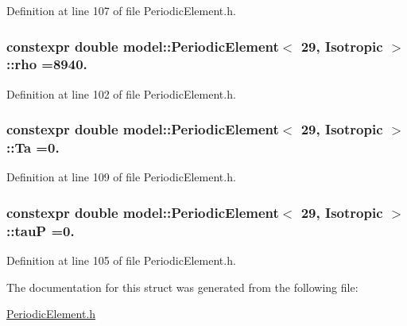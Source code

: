 Definition at line 107 of file Periodic\+Element.\+h.

\hypertarget{structmodel_1_1_periodic_element_3_0129_00_01_isotropic_01_4_a609e7ff6cc0c9f0669856defdfe05aa2}{}
\subsubsection[{rho}]{\setlength{\rightskip}{0pt plus 5cm}constexpr double {\bf model\+::\+Periodic\+Element}$<$ 29, {\bf Isotropic} $>$\+::rho =8940.\hspace{0.3cm}{\ttfamily [static]}}\label{structmodel_1_1_periodic_element_3_0129_00_01_isotropic_01_4_a609e7ff6cc0c9f0669856defdfe05aa2}


Definition at line 102 of file Periodic\+Element.\+h.

\hypertarget{structmodel_1_1_periodic_element_3_0129_00_01_isotropic_01_4_a33509e726cdb121a126343761e1cacbb}{}
\subsubsection[{Ta}]{\setlength{\rightskip}{0pt plus 5cm}constexpr double {\bf model\+::\+Periodic\+Element}$<$ 29, {\bf Isotropic} $>$\+::Ta =0.\hspace{0.3cm}{\ttfamily [static]}}\label{structmodel_1_1_periodic_element_3_0129_00_01_isotropic_01_4_a33509e726cdb121a126343761e1cacbb}


Definition at line 109 of file Periodic\+Element.\+h.

\hypertarget{structmodel_1_1_periodic_element_3_0129_00_01_isotropic_01_4_a61ad64a1596b7b810e2fdd03e2d2417d}{}
\subsubsection[{tau\+P}]{\setlength{\rightskip}{0pt plus 5cm}constexpr double {\bf model\+::\+Periodic\+Element}$<$ 29, {\bf Isotropic} $>$\+::tau\+P =0.\hspace{0.3cm}{\ttfamily [static]}}\label{structmodel_1_1_periodic_element_3_0129_00_01_isotropic_01_4_a61ad64a1596b7b810e2fdd03e2d2417d}


Definition at line 105 of file Periodic\+Element.\+h.



The documentation for this struct was generated from the following file\+:\begin{DoxyCompactItemize}
\item 
\hyperlink{_periodic_element_8h}{Periodic\+Element.\+h}\end{DoxyCompactItemize}

